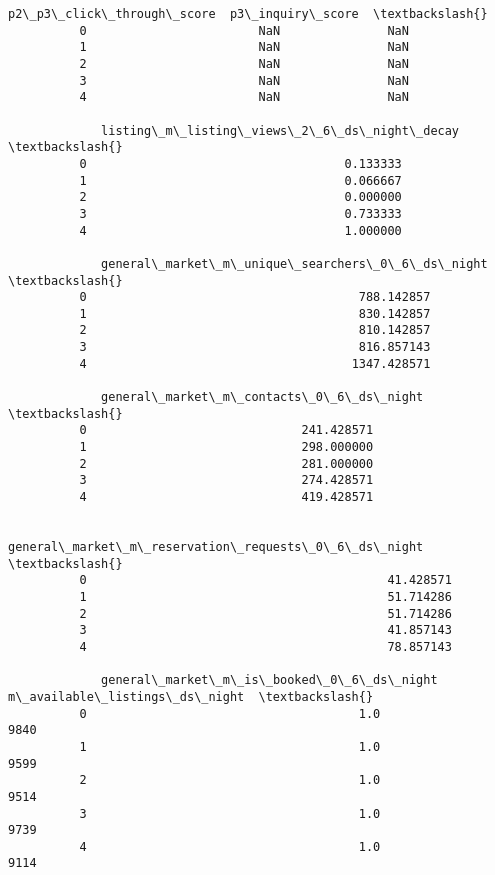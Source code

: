 \documentclass[11pt]{article}
\begin{document}
\begin{Verbatim}[commandchars=\\\{\}]
             p2\_p3\_click\_through\_score  p3\_inquiry\_score  \textbackslash{}
          0                        NaN               NaN   
          1                        NaN               NaN   
          2                        NaN               NaN   
          3                        NaN               NaN   
          4                        NaN               NaN   
          
             listing\_m\_listing\_views\_2\_6\_ds\_night\_decay  \textbackslash{}
          0                                    0.133333   
          1                                    0.066667   
          2                                    0.000000   
          3                                    0.733333   
          4                                    1.000000   
          
             general\_market\_m\_unique\_searchers\_0\_6\_ds\_night  \textbackslash{}
          0                                      788.142857   
          1                                      830.142857   
          2                                      810.142857   
          3                                      816.857143   
          4                                     1347.428571   
          
             general\_market\_m\_contacts\_0\_6\_ds\_night  \textbackslash{}
          0                              241.428571   
          1                              298.000000   
          2                              281.000000   
          3                              274.428571   
          4                              419.428571   
          
             general\_market\_m\_reservation\_requests\_0\_6\_ds\_night  \textbackslash{}
          0                                          41.428571    
          1                                          51.714286    
          2                                          51.714286    
          3                                          41.857143    
          4                                          78.857143    
          
             general\_market\_m\_is\_booked\_0\_6\_ds\_night  m\_available\_listings\_ds\_night  \textbackslash{}
          0                                      1.0                           9840   
          1                                      1.0                           9599   
          2                                      1.0                           9514   
          3                                      1.0                           9739   
          4                                      1.0                           9114   
          

\end{Verbatim}
\end{document}
